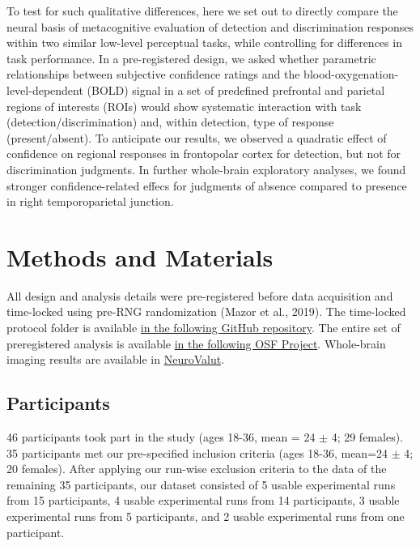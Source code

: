 \documentclass[12pt,twoside]{reedthesis}
\begin{document}
To test for such qualitative differences, here we set out to directly compare the neural basis of metacognitive evaluation of detection and discrimination responses within two similar low-level perceptual tasks, while controlling for differences in task performance. In a pre-registered design, we asked whether parametric relationships between subjective confidence ratings and the blood-oxygenation-level-dependent (BOLD) signal in a set of predefined prefrontal and parietal regions of interests (ROIs) would show systematic interaction with task (detection/discrimination) and, within detection, type of response (present/absent). To anticipate our results, we observed a quadratic effect of confidence on regional responses in frontopolar cortex for detection, but not for discrimination judgments. In further whole-brain exploratory analyses, we found stronger confidence-related effecs for judgments of absence compared to presence in right temporoparietal junction.

\hypertarget{methods-and-materials}{%
\section{Methods and Materials}\label{methods-and-materials}}

All design and analysis details were pre-registered before data acquisition and time-locked using pre-RNG randomization (Mazor et al., 2019). The time-locked protocol folder is available \href{https://www.github.com/matanmazor/detectionVsDiscrimination_fMRI}{in the following GitHub repository}. The entire set of preregistered analysis is available \href{https://www.osf.io/98mv4}{in the following OSF Project}. Whole-brain imaging results are available in \href{https://neurovault.org/collections/VVLPQBWK/}{NeuroValut}.

\hypertarget{participants-7}{%
\subsection{Participants}\label{participants-7}}

46 participants took part in the study (ages 18-36, mean = 24 \(\pm\) 4; 29 females). 35 participants met our pre-specified inclusion criteria (ages 18-36, mean=24 \(\pm\) 4; 20 females). After applying our run-wise exclusion criteria to the data of the remaining 35 participants, our dataset consisted of 5 usable experimental runs from 15 participants, 4 usable experimental runs from 14 participants, 3 usable experimental runs from 5 participants, and 2 usable experimental runs from one participant.
\end{document}

